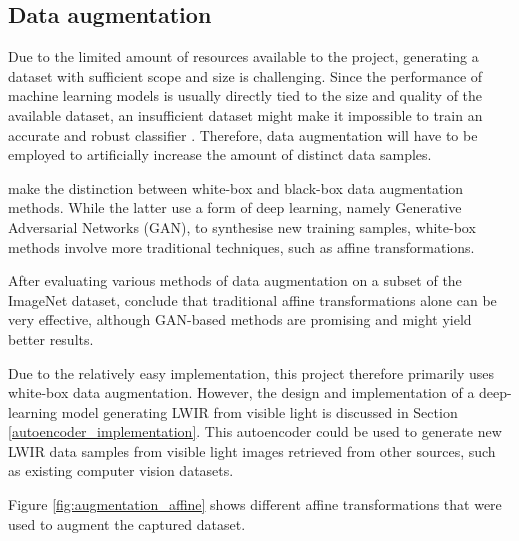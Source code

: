 \documentclass{l4proj}
\begin{document}
\subsection{Data augmentation}

Due to the limited amount of resources available to the project, generating a dataset with sufficient scope and size is challenging. Since the performance of machine learning models is usually directly tied to the size and quality of the available dataset, an insufficient dataset might make it impossible to train an accurate and robust classifier \citep{fawzi_adaptive_2016}. Therefore, data augmentation will have to be employed to artificially increase the amount of distinct data samples.

\citet{mikolajczyk_data_2018} make the distinction between white-box and black-box data augmentation methods. While the latter use a form of deep learning, namely Generative Adversarial Networks (GAN), to synthesise new training samples, white-box methods involve more traditional techniques, such as affine transformations. 

After evaluating various methods of data augmentation on a subset of the ImageNet dataset, \citet{perez_effectiveness_2017} conclude that traditional affine transformations alone can be very effective, although GAN-based methods are promising and might yield better results.

Due to the relatively easy implementation, this project therefore primarily uses white-box data augmentation. However, the design and implementation of a deep-learning model generating LWIR from visible light is discussed in Section \ref{autoencoder_implementation}. This autoencoder could be used to generate new LWIR data samples from visible light images retrieved from other sources, such as existing computer vision datasets.

Figure \ref{fig:augmentation_affine} shows different affine transformations that were used to augment the captured dataset.
\end{document}
